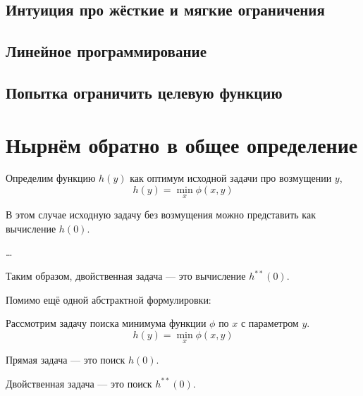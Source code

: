 \documentclass[
  letterpaper,
  DIV=11,
  numbers=noendperiod]{scrartcl}
\begin{document}
\subsection{Интуиция про жёсткие и мягкие
ограничения}\label{ux438ux43dux442ux443ux438ux446ux438ux44f-ux43fux440ux43e-ux436ux451ux441ux442ux43aux438ux435-ux438-ux43cux44fux433ux43aux438ux435-ux43eux433ux440ux430ux43dux438ux447ux435ux43dux438ux44f}

\subsection{Линейное
программирование}\label{ux43bux438ux43dux435ux439ux43dux43eux435-ux43fux440ux43eux433ux440ux430ux43cux43cux438ux440ux43eux432ux430ux43dux438ux435}

\subsection{Попытка ограничить целевую
функцию}\label{ux43fux43eux43fux44bux442ux43aux430-ux43eux433ux440ux430ux43dux438ux447ux438ux442ux44c-ux446ux435ux43bux435ux432ux443ux44e-ux444ux443ux43dux43aux446ux438ux44e}

\section{Нырнём обратно в общее
определение}\label{ux43dux44bux440ux43dux451ux43c-ux43eux431ux440ux430ux442ux43dux43e-ux432-ux43eux431ux449ux435ux435-ux43eux43fux440ux435ux434ux435ux43bux435ux43dux438ux435}

Определим функцию \(h(y)\) как оптимум исходной задачи про возмущении
\(y\), \[
h(y) = \min_x \phi(x, y)
\]

В этом случае исходную задачу без возмущения можно представить как
вычисление \(h(0)\).

\ldots{}

Таким образом, двойственная задача --- это вычисление \(h^{**}(0)\).

Помимо ещё одной абстрактной формулировки:

\begin{tcolorbox}[enhanced jigsaw, coltitle=black, colback=white, opacitybacktitle=0.6, colframe=quarto-callout-note-color-frame, titlerule=0mm, leftrule=.75mm, bottomrule=.15mm, opacityback=0, toptitle=1mm, bottomtitle=1mm, arc=.35mm, colbacktitle=quarto-callout-note-color!10!white, title=\textcolor{quarto-callout-note-color}{\faInfo}\hspace{0.5em}{Правильное определение двойственной задачи}, rightrule=.15mm, breakable, toprule=.15mm, left=2mm]

Рассмотрим задачу поиска минимума функции \(\phi\) по \(x\) с параметром
\(y\). \[
h(y) = \min_x \phi(x, y)
\]

Прямая задача --- это поиск \(h(0)\).

Двойственная задача --- это поиск \(h^{**}(0)\).

\end{tcolorbox}
\end{document}
